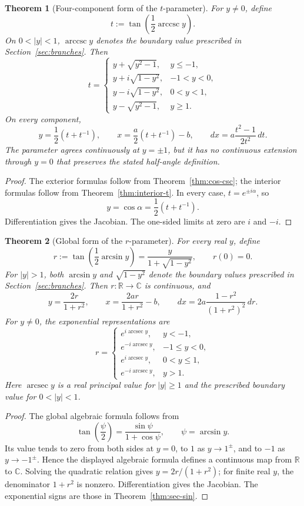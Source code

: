 \documentclass[11pt]{article}
\newtheorem{theorem}{Theorem}[section]
\theoremstyle{remark}
\DeclareMathOperator{\arccsc}{arccsc}
\DeclareMathOperator{\arcsec}{arcsec}
\begin{document}
\begin{theorem}[Four-component form of the $t$-parameter]
\label{thm:four-t}
For $y\ne0$, define
\[
t:=\tan\!\left(\frac{1}{2}\arccsc y\right).
\]
On $0<|y|<1$, $\arccsc y$ denotes the boundary value prescribed in Section~\ref{sec:branches}. Then
\[
t=
\begin{cases}
y+\sqrt{y^2-1},&y\le-1,\\[1mm]
y+i\sqrt{1-y^2},&-1<y<0,\\[1mm]
y-i\sqrt{1-y^2},&0<y<1,\\[1mm]
y-\sqrt{y^2-1},&y\ge1.
\end{cases}
\]
On every component,
\[
y=\frac{1}{2}\left(t+t^{-1}\right),
\qquad
x=\frac{a}{2}\left(t+t^{-1}\right)-b,
\qquad
dx=a\frac{t^2-1}{2t^2}\,dt.
\]
The parameter agrees continuously at $y=\pm1$, but it has no continuous extension through $y=0$ that preserves the stated half-angle definition.
\end{theorem}

\begin{proof}
The exterior formulas follow from Theorem~\ref{thm:cos-csc}; the interior formulas follow from Theorem~\ref{thm:interior-t}. In every case, $t=e^{\pm i\alpha}$, so
\[
y=\cos\alpha=\frac{1}{2}\left(t+t^{-1}\right).
\]
Differentiation gives the Jacobian. The one-sided limits at zero are $i$ and $-i$.
\end{proof}

\begin{theorem}[Global form of the $r$-parameter]
\label{thm:global-r}
For every real $y$, define
\[
r:=\tan\!\left(\frac{1}{2}\arcsin y\right)
=\frac{y}{1+\sqrt{1-y^2}},
\qquad r(0)=0.
\]
For $|y|>1$, both $\arcsin y$ and $\sqrt{1-y^2}$ denote the boundary values prescribed in Section~\ref{sec:branches}. Then $r:\mathbb R\to\mathbb C$ is continuous, and
\[
y=\frac{2r}{1+r^2},
\qquad
x=\frac{2ar}{1+r^2}-b,
\qquad
dx=2a\frac{1-r^2}{(1+r^2)^2}\,dr.
\]
For $y\ne0$, the exponential representations are
\[
r=
\begin{cases}
e^{i\arcsec y},&y<-1,\\[1mm]
e^{-i\arcsec y},&-1\le y<0,\\[1mm]
e^{i\arcsec y},&0<y\le1,\\[1mm]
e^{-i\arcsec y},&y>1.
\end{cases}
\]
Here $\arcsec y$ is a real principal value for $|y|\ge1$ and the prescribed boundary value for $0<|y|<1$.
\end{theorem}

\begin{proof}
The global algebraic formula follows from
\[
\tan\!\left(\frac{\psi}{2}\right)=\frac{\sin\psi}{1+\cos\psi},
\qquad \psi=\arcsin y.
\]
Its value tends to zero from both sides at $y=0$, to $1$ as $y\to1^\pm$, and to $-1$ as $y\to-1^\pm$. Hence the displayed algebraic formula defines a continuous map from $\mathbb R$ to $\mathbb C$. Solving the quadratic relation gives $y=2r/(1+r^2)$; for finite real $y$, the denominator $1+r^2$ is nonzero. Differentiation gives the Jacobian. The exponential signs are those in Theorem~\ref{thm:sec-sin}.
\end{proof}
\end{document}
